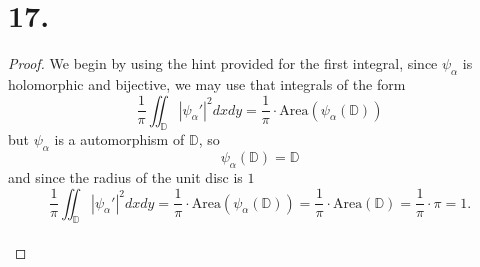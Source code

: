 \documentclass{article}
\begin{document}
\section*{17.}
\begin{proof}
  We begin by using the hint provided for the first integral, since $\psi_{\alpha}$ is holomorphic and bijective, we may use that integrals of the form 
  \[
    \frac{1}{\pi}\iint_{\mathbb{D}}|\psi_{\alpha}'|^2dx dy = \frac{1}{\pi}\cdot \text{Area}(\psi_{\alpha}(\mathbb{D}))
  \]
  but $\psi_{\alpha}$ is a automorphism of $\mathbb{D}$, so
  \[
  \psi_{\alpha}(\mathbb{D}) = \mathbb{D}  
  \]
  and since the radius of the unit disc is $1$
  \[
    \frac{1}{\pi}\iint_{\mathbb{D}}|\psi_{\alpha}'|^2dx dy = \frac{1}{\pi}\cdot \text{Area}(\psi_{\alpha}(\mathbb{D})) = \frac{1}{\pi}\cdot \text{Area}(\mathbb{D}) = \frac{1}{\pi}\cdot \pi = 1.
  \]\\


\end{proof}
\end{document}
